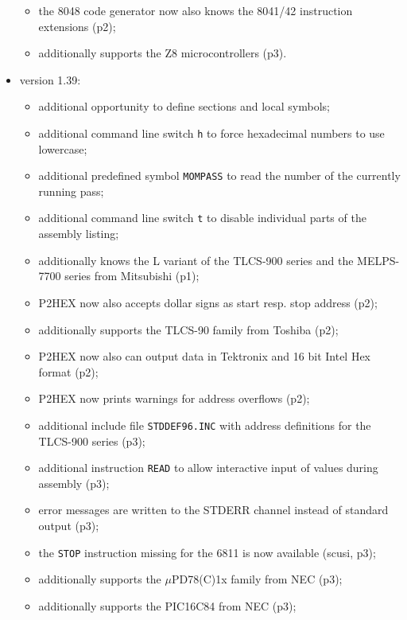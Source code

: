 \documentclass[12pt,twoside]{report}
\newcommand{\tty}[1]{{\tt #1}}
\begin{document}
\begin{itemize}
{\begin{itemize}
{            dollar signs (p2);}
      \item{the 8048 code generator now also knows the 8041/42
            instruction extensions (p2);}
      \item{additionally supports the Z8 microcontrollers (p3).}
      \end{itemize}}
\item{version 1.39:
      \begin{itemize}
      \item{additional opportunity to define sections and local
            symbols;}
      \item{additional command line switch \tty{h} to force hexadecimal
            numbers to use lowercase;}
      \item{additional predefined symbol \tty{MOMPASS} to read the
            number of the currently running pass;}
      \item{additional command line switch \tty{t} to disable
            individual parts of the assembly listing;}
      \item{additionally knows the L variant of the TLCS-900
            series and the MELPS-7700 series from Mitsubishi
            (p1);}
      \item{P2HEX now also accepts dollar signs as start resp.
            stop address (p2);}
      \item{additionally supports the TLCS-90 family from
            Toshiba (p2);}
      \item{P2HEX now also can output data in Tektronix and
            16 bit Intel Hex format (p2);}
      \item{P2HEX now prints warnings for address overflows
            (p2);}
      \item{additional include file \tty{STDDEF96.INC} with address
            definitions for the TLCS-900 series (p3);}
      \item{additional instruction \tty{READ} to allow interactive
            input of values during assembly (p3);}
      \item{error messages are written to the STDERR channel
            instead of standard output (p3);}
      \item{the \tty{STOP} instruction missing for the 6811 is now
            available (scusi, p3);}
      \item{additionally supports the $\mu$PD78(C)1x family from
            NEC (p3);}
      \item{additionally supports the PIC16C84 from NEC (p3);}

\end{itemize}}
\end{itemize}
\end{document}
